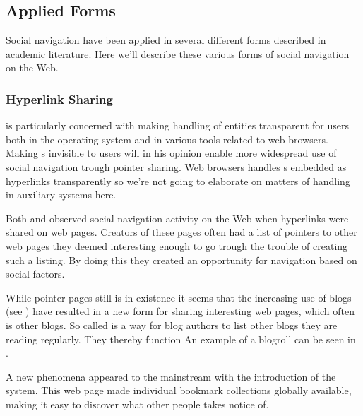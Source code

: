 
\subsection{Applied Forms}

Social navigation have been applied in several different forms described in
academic literature. Here we'll describe these various forms of social
navigation on the Web.

\subsubsection{Hyperlink Sharing}

\citet{dieberger97} is particularly concerned with making handling of
%
entities transparent for users both in the operating system and in various
tools related to web browsers. Making s invisible to users will in
his opinion enable more widespread use of social navigation trough pointer
sharing. Web browsers handles s embedded as hyperlinks transparently
so we're not going to elaborate on matters of  handling in
auxiliary systems here.

Both \cite{dourish94} and \cite{dieberger97} observed social navigation
activity on the
Web when hyperlinks were shared on web pages. Creators of these pages often
had a list of pointers to other web pages they deemed interesting enough to go
trough the trouble of creating such a listing. By doing this they created
an opportunity for navigation based on social factors.

While pointer pages still is in existence it seems that the increasing
use of blogs (see )
have resulted in a new form for sharing interesting web pages,
which often is other blogs. So called  is a way for blog
authors to list other blogs they are reading regularly. They thereby function
An example of a blogroll can be seen in .

A new phenomena appeared to the mainstream with the introduction of the
 system. This web page made individual
bookmark collections globally available, making it easy to discover what other
people takes notice of.

